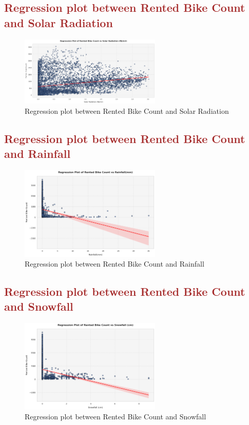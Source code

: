 \documentclass[12pt, letterpaper]{article}
\begin{document}
\subsection*{\textcolor{brown}{Regression plot between Rented Bike Count and Solar Radiation}}

\begin{figure}[h]
  \centering
  \includegraphics[width=0.6\textwidth]{regression6.png}
  \caption{Regression plot between Rented Bike Count and Solar Radiation}
\end{figure}

\newpage

\subsection*{\textcolor{brown}{Regression plot between Rented Bike Count and Rainfall}}

\begin{figure}[h]
  \centering
  \includegraphics[width=0.6\textwidth]{regression7.png}
  \caption{Regression plot between Rented Bike Count and Rainfall}
\end{figure}

\subsection*{\textcolor{brown}{Regression plot between Rented Bike Count and Snowfall}}

\begin{figure}[h]
  \centering
  \includegraphics[width=0.6\textwidth]{regression8.png}
  \caption{Regression plot between Rented Bike Count and Snowfall}
\end{figure}
\end{document}

